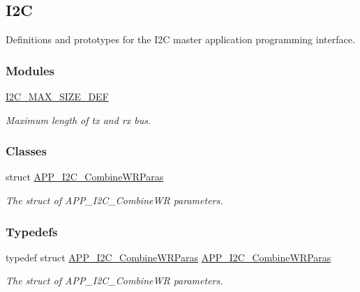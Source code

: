 \hypertarget{group___i2_c}{}\subsection{I2C}
\label{group___i2_c}


Definitions and prototypes for the I2C master application programming interface.  


\subsubsection*{Modules}
\begin{DoxyCompactItemize}
\item 
\hyperlink{group___i2_c___m_a_x___s_i_z_e___d_e_f}{I2\+C\+\_\+\+M\+A\+X\+\_\+\+S\+I\+Z\+E\+\_\+\+D\+EF}
\begin{DoxyCompactList}\small\item\em Maximum length of tx and rx bus. \end{DoxyCompactList}\end{DoxyCompactItemize}
\subsubsection*{Classes}
\begin{DoxyCompactItemize}
\item 
struct \hyperlink{struct_a_p_p___i2_c___combine_w_r_paras}{A\+P\+P\+\_\+\+I2\+C\+\_\+\+Combine\+W\+R\+Paras}
\begin{DoxyCompactList}\small\item\em The struct of A\+P\+P\+\_\+\+I2\+C\+\_\+\+Combine\+WR parameters. \end{DoxyCompactList}\end{DoxyCompactItemize}
\subsubsection*{Typedefs}
\begin{DoxyCompactItemize}
\item 
typedef struct \hyperlink{struct_a_p_p___i2_c___combine_w_r_paras}{A\+P\+P\+\_\+\+I2\+C\+\_\+\+Combine\+W\+R\+Paras} \hyperlink{group___i2_c_gaaf35ba903a08c04ed6c7d2b614222d32}{A\+P\+P\+\_\+\+I2\+C\+\_\+\+Combine\+W\+R\+Paras}\hypertarget{group___i2_c_gaaf35ba903a08c04ed6c7d2b614222d32}{}\label{group___i2_c_gaaf35ba903a08c04ed6c7d2b614222d32}

\begin{DoxyCompactList}\small\item\em The struct of A\+P\+P\+\_\+\+I2\+C\+\_\+\+Combine\+WR parameters. \end{DoxyCompactList}\end{DoxyCompactItemize}
